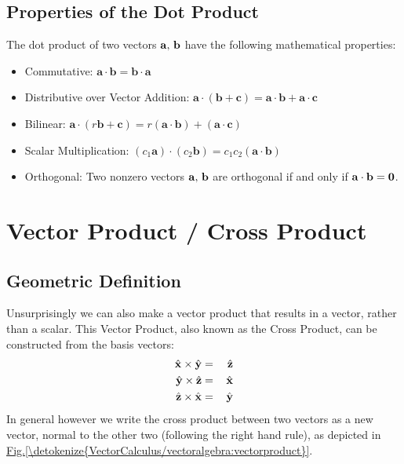 \documentclass[letterpaper,10pt,english]{jupyterBook}
\begin{document}
\subsection{Properties of the Dot Product}
\label{\detokenize{VectorCalculus/vectoralgebra:properties-of-the-dot-product}}
\sphinxAtStartPar
The dot product of two vectors \(\bf a,\, b\) have the following mathematical properties:
\begin{itemize}
\item {} 
\sphinxAtStartPar
Commutative:
\(\mathbf {a} \cdot \mathbf {b} = \mathbf {b} \cdot \mathbf {a}\)

\item {} 
\sphinxAtStartPar
Distributive over Vector Addition:
\(  \mathbf {a} \cdot (\mathbf {b} +\mathbf {c} )=\mathbf {a} \cdot \mathbf {b} +\mathbf {a} \cdot \mathbf {c}\)

\item {} 
\sphinxAtStartPar
Bilinear:
\( \mathbf {a} \cdot (r\mathbf {b} +\mathbf {c} )=r(\mathbf {a} \cdot \mathbf {b} )+(\mathbf {a} \cdot \mathbf {c} )\)

\item {} 
\sphinxAtStartPar
Scalar Multiplication:
\( (c_{1}\mathbf {a} )\cdot (c_{2}\mathbf {b} )=c_{1}c_{2}(\mathbf {a} \cdot \mathbf {b} )\)

\item {} 
\sphinxAtStartPar
Orthogonal:
Two non\sphinxhyphen{}zero vectors \(\bf a,\, b\) are orthogonal if and only if \(\bf a \cdot b = 0\).

\end{itemize}


\section{Vector Product / Cross Product}
\label{\detokenize{VectorCalculus/vectoralgebra:vector-product-cross-product}}

\subsection{Geometric Definition}
\label{\detokenize{VectorCalculus/vectoralgebra:geometric-definition}}
\sphinxAtStartPar
Unsurprisingly we can also make a vector product that results in a vector, rather than a scalar.  This Vector Product, also known as the Cross Product,
can be constructed from the basis vectors:
\begin{equation*}
\begin{split}\hat{\bf x} \times \hat{\bf y} &=&\, \hat{\bf z} \\
\hat{\bf y} \times \hat{\bf z} &=&\, \hat{\bf x} \\
\hat{\bf z} \times \hat{\bf x} &=&\, \hat{\bf y} \end{split}
\end{equation*}
\sphinxAtStartPar
In general however we write the cross product between two vectors as a new vector, normal to the other two (following the right hand rule), as depicted in
\hyperref[\detokenize{VectorCalculus/vectoralgebra:vectorproduct}]{Fig.\@ \ref{\detokenize{VectorCalculus/vectoralgebra:vectorproduct}}}.
\end{document}
